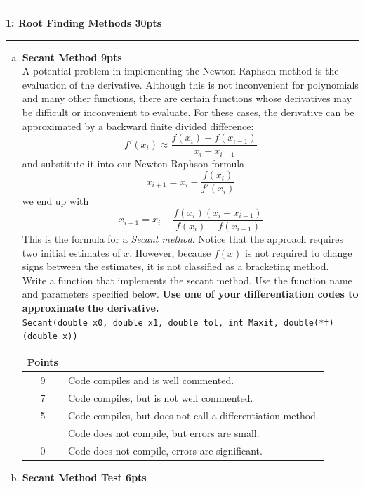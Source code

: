 \documentclass[11pt]{article}
\newcommand\question[2]{\vspace{.25in}\hrule\textbf{#1: #2}\vspace{.5em}\hrule\vspace{.10in}}
\begin{document}
\newpage
\question{1}{Root Finding Methods \color{red} 30pts}
\begin{enumerate}[(a)]
	\item \textbf{Secant Method \color{red} 9pts}\\
	A potential problem in implementing the Newton-Raphson method is
	the evaluation of the derivative. Although this is not inconvenient for polynomials and many other functions, there are certain functions whose derivatives may be difficult or inconvenient to evaluate. For these cases, the derivative can be approximated by a backward finite divided difference:
	$$ f'(x_i) \approx \frac{f(x_{i})-f(x_{i-1})}{x_{i}-x_{i-1}}$$
	and substitute it into our Newton-Raphson formula
	$$x_{i+1} = x_i - \frac{f(x_i)}{f'(x_i)}$$
	we end up with 
	$$x_{i+1} = x_i - \frac{f(x_i)\left(x_{i}-x_{i-1}\right)}{f(x_{i})-f(x_{i-1})} $$
	This is the formula for a \textit{Secant method}. Notice that the approach requires two initial estimates of $x$. However, because $f(x)$ is not required to change signs between the estimates, it is not classified as a bracketing method. \\\vspace{10pt}
	Write a function that implements the secant method. Use the function name and parameters specified below. \textbf{Use one of your differentiation codes to approximate the derivative.} \\\vspace{10pt}
	\texttt{Secant(double x0, double x1, double tol, int Maxit, double(*f)(double x))}
	\begin{table}[H]
		\centering
		\color{red}
		\begin{tabular}{| c | l |}
			\hline
			Points & \\
			\hline
			9 & Code compiles and is well commented. \\
			\hline
			7 & Code compiles, but is not well commented. \\
			\hline
			5 & Code compiles, but does not call a differentiation method. \\
			  & Code does not compile, but errors are small. \\
			\hline
			0 & Code does not compile, errors are significant.\\
			\hline
		\end{tabular}
	\end{table}
	\item \textbf{Secant Method Test \color{red} 6pts}\\

\end{enumerate}
\end{document}
